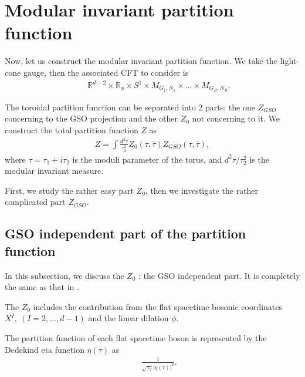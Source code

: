 \documentclass[a4paper,12pt]{article}
\numberwithin{equation}{section}
\newcommand{\Rb}{{\mathbb R}}
\newcommand{\taub}{\bar{\tau}}
\begin{document}
\section{Modular invariant partition function}\label{Sec3}

Now, let us construct the modular invariant partition function.
We take the light-cone gauge, then the associated
 CFT to consider is
\begin{eqnarray*}
 && \Rb^{d-2}\times \Rb_{\phi} \times S^1 \times M_{G_1,N_1}\times
\dots\times M_{G_R,N_R}.
\end{eqnarray*}

The toroidal partition function can be separated into 2 parts:
the one $Z_{GSO}$ concerning to the GSO projection and the
other $Z_0$ not concerning to it. We construct
 the total partition function $Z$ as
\begin{eqnarray*}
 Z=\int \frac{d^2\tau}{\tau_2^2}Z_0(\tau,\taub)Z_{GSO}(\tau,\taub),
\end{eqnarray*}
where $\tau=\tau_1+i\tau_2$ is the moduli parameter of the torus,
and $d^2\tau/\tau_2^2$ is the modular invariant measure.

First, we study the rather easy part $Z_0$, then we investigate
the rather complicated part $Z_{GSO}$.

\subsection{GSO independent part of the partition function}

In this subsection, we discuss the $Z_0$ : the GSO independent part.
It is completely the same as that in \cite{ES0002}.

The $Z_0$ includes the contribution from
the flat spacetime bosonic coordinates $X^I,\ (I=2,\dots,d-1)$ 
and the linear dilation $\phi$.

The partition function of each flat spacetime
boson is represented
by the Dedekind eta function $\eta(\tau)$ as
\begin{eqnarray*}
 &&\frac{1}{\sqrt{\tau_2}|\eta(\tau)|^2}.
\end{eqnarray*}
\end{document}
